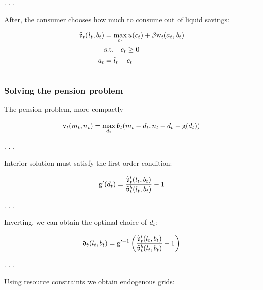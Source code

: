 \documentclass[
  letterpaper,
  DIV=11,
  numbers=noendperiod]{scrartcl}
\begin{document}
. . .

After, the consumer chooses how much to consume out of liquid savings:

\[\begin{equation}
\begin{split}
    \tilde{\mathfrak{v}}_{t}(l_{t}, b_{t}) & = \max_{c_{t}} u(c_{t}) + \beta \mathrm{w}_{t}(a_{t}, b_{t})  \\
    & \text{s.t.} \quad c_{t} \ge 0 \\
    a_{t} & = l_{t} - c_{t}
  \end{split}
\end{equation}\]

\begin{center}\rule{0.5\linewidth}{0.5pt}\end{center}

\hypertarget{solving-the-pension-problem}{%
\subsubsection{Solving the pension
problem}\label{solving-the-pension-problem}}

The pension problem, more compactly

\[\begin{equation}
\mathrm{v}_{t}(m_{t}, n_{t}) = \max_{d_{t}}
  \tilde{\mathfrak{v}}_{t}(m_{t} - d_{t}, n_{t} + d_{t} + \mathrm{g}(d_{t}))
\end{equation}\]

. . .

Interior solution must satisfy the first-order condition:

\[\begin{equation}
\mathrm{g}'(d_{t}) = \frac{\tilde{\mathfrak{v}}_{t}^{l}(l_{t},
    b_{t})}{\tilde{\mathfrak{v}}_{t}^{b}(l_{t}, b_{t})} - 1
\end{equation}\]

. . .

Inverting, we can obtain the optimal choice of \(d_{t}\):

\[\begin{equation}
\mathfrak{d}_{t}(l_{t}, b_{t}) = \mathrm{g}'^{-1}\left(
  \frac{\tilde{\mathfrak{v}}_{t}^{l}(l_{t},
    b_{t})}{\tilde{\mathfrak{v}}_{t}^{b}(l_{t},
    b_{t})} - 1 \right)
\end{equation}\]

. . .

Using resource constraints we obtain endogenous grids:
\end{document}
